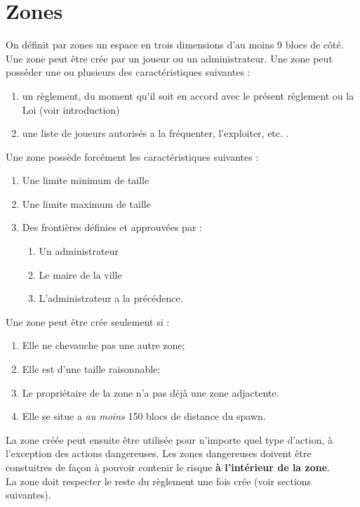 \section{Zones}
\begin{flushleft}
	On d\'efinit par zones un espace en trois dimensions d'au moins 9 blocs de c\^ot\'e.\\
	Une zone peut \^etre cr\'ee par un joueur ou un administrateur. Une zone peut poss\'eder une ou plusieurs des caract\'eristiques suivantes :
	\begin{enumerate}
		\item un r\`eglement, du moment qu'il soit en accord avec le pr\'esent r\`eglement ou la Loi (voir introduction)
		\item une liste de joueurs autoris\'es a la fr\'equenter, l'exploiter, etc. .
	\end{enumerate}
	Une zone poss\`ede forc\'ement les caract\'eristiques suivantes :
	\begin{enumerate}
		\item Une limite minimum de taille
		\item Une limite maximum de taille
		\item Des fronti\`eres d\'efinies et approuv\'ees par :
		\begin{enumerate}
			\item Un administrateur
			\item Le maire de la ville
			\item L'administrateur a la pr\'ec\'edence.
		\end{enumerate}
	\end{enumerate}
	Une zone peut \^etre cr\'ee seulement si :
	\begin{enumerate}
		\item Elle ne chevauche pas une autre zone;
		\item Elle est d'une taille raisonnable;
		\item Le propri\'etaire de la zone n'a pas d\'ej\`a une zone adjactente.
		\item Elle se situe a \textit{au moins} 150 blocs de distance du spawn.
	\end{enumerate}
	La zone cr\'e\'ee peut ensuite \^etre utilis\'ee pour n'importe quel type d'action, \`a l'exception des actions dangereuses. Les zones dangereuses doivent \^etre constuitres de fa\c con \`a pouvoir contenir le risque \textbf{\`a l'int\'erieur de la zone}. \\
	La zone doit respecter le reste du r\`eglement une fois cr\'ee (voir sections suivantes).
\end{flushleft}

